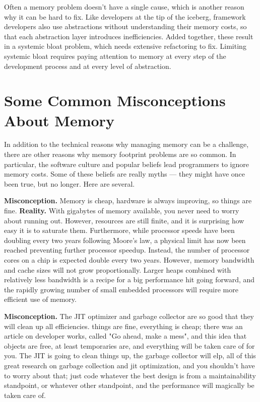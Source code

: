 Often a memory problem doesn't have a single cause, which is another reason why
it can be hard to fix. Like developers at the tip of the iceberg, framework
developers also use abstractions without understanding their memory costs, so
that each abstraction layer introduces inefficiencies. Added together, these  
result in a systemic bloat problem, which needs extensive refactoring to
fix. Limiting systemic bloat requires paying attention to memory
 at every step of the development process and at every level of abstraction.


\section{Some Common Misconceptions About Memory}

In addition to the technical reasons why managing memory can be a challenge, there
are other reasons why memory footprint problems are so common. In particular,
the software culture and popular beliefs lead programmers to ignore memory
costs. Some of these beliefs are really myths --- they might have once
been true, but no longer. Here are several.

\textbf{Misconception.} Memory is cheap, hardware is always improving, so
things are fine. \textbf{Reality.} With gigabytes of memory available, you never
need to worry about running out. However, resources are still finite, and it is surprising how easy it is to
saturate them. Furthermore, while processor speeds have been doubling every two
years following Moore's law, a physical limit has now been reached preventing further processor speedup. 
Instead, the number of processor cores on a chip is expected double every two years. However,
memory bandwidth and cache sizes will not grow proportionally. 
 Larger heaps combined with relatively less bandwidth is a recipe for a big performance hit going forward, 
 and the rapidly growing number of small embedded processors will require more
 efficient use of memory.

\textbf{Misconception.} The JIT optimizer and garbage collector are so good that
they will clean up all efficiencies. things are fine, everything is cheap; there was an
article on developer works, called "Go ahead, make a mess",  and this idea that objects are free, at least temporaries are,
 and everything will be taken care of for you. The JIT is going to clean things up, the garbage collector will elp, 
 all of this great research 
  on garbage collection and jit optimization, and you shouldn't have to worry about that; just code whatever the best design 
  is from a maintainability standpoint, or whatever other standpoint, and the performance will magically be taken care of.

